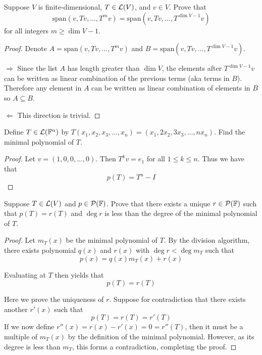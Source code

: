 \documentclass{extarticle}
\begin{document}
\begin{problem}{10}
    Suppose \(V\) is finite-dimensional, \(T \in \mathcal{L}(V)\), and \(v \in V\). Prove that 
    \[\text{span}(v, Tv, \ldots, T^m v) = \text{span}(v, Tv, \ldots, T^{\dim V - 1}v)\]
    for all integers \(m \geq \dim V - 1\).
\end{problem}

\begin{proof}
    Denote \(A = \text{span}(v, Tv, \ldots, T^m v)\) and \(B = \text{span}(v, Tv, \ldots, T^{\dim V - 1}v)\).

\(\Rightarrow\) Since the list \(A\) has length greater than \(\dim V\), the elements after \(T^{\dim V - 1}v\)
can be written as linear combination of the previous terms (aka terms in \(B\)). Therefore any element in \(A\) 
can be written as linear combination of elements in \(B\) so \(A \subseteq B\).

\(\Leftarrow\) This direction is trivial. 
\end{proof}

\begin{problem}{12}
    Define \(T \in \mathcal{L}(\mathbb{F}^n)\) by \(T(x_1, x_2, x_3, \ldots, x_n) = (x_1, 2x_2, 3x_3, \ldots, n x_n)\). 
    Find the minimal polynomial of \(T\).
\end{problem}

\begin{proof}
Let \(v = (1, 0, 0, \ldots, 0)\). Then \(T^k v = e_1\) for all \(1 \leq k \leq n\). Thus we have that 
\[p(T) = T^n - I\]
\end{proof}

\begin{problem}{13}
    Suppose \(T \in \mathcal{L}(V)\) and \(p \in \mathcal{P}(\mathbb{F})\). Prove that there exists a unique \(r \in \mathcal{P}(\mathbb{F})\)
    such that \(p(T) = r(T)\) and \(\deg r\) is less than the degree of the minimal polynomial 
    of \(T\). 
\end{problem}

\begin{proof}
Let \(m_T(x)\) be the minimal polynomial of \(T\). By the division algorithm, there exists polynomial 
\(q(x)\) and \(r(x)\) with \(\deg r < \deg m_T\) such that 
\[p(x) = q(x)m_T(x) + r(x)\]

Evaluating at \(T\) then yields that 
\[p(T) = r(T)\]

Here we prove the uniqueness of \(r\). Suppose for contradiction that there exists another \(r'(x)\) such 
that 
\[p(T) = r(T) = r'(T)\]
If we now define \(r''(x) = r(x) - r'(x) = 0 = r''(T)\), then it must be a multiple of \(m_T(x)\) by the definition 
of the minimal polynomial. However, as its degree is less than \(m_T\), this forms a contradiction, 
completing the proof. 
\end{proof}
\end{document}
